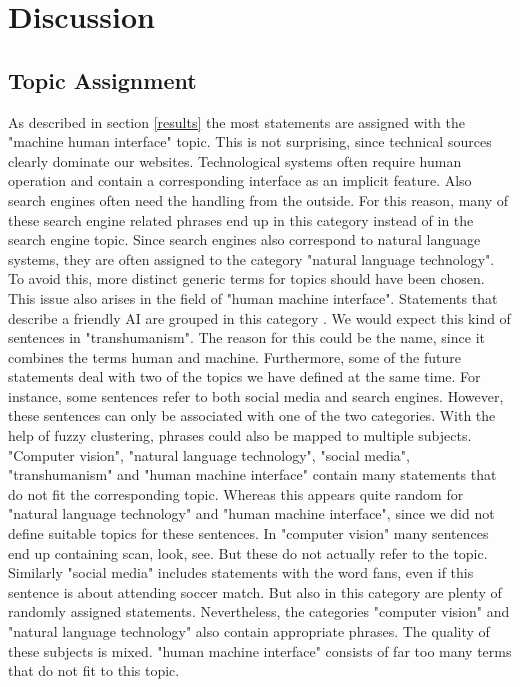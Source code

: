 \section{Discussion}

\subsection{Topic Assignment}
As described in section \ref{results} the most statements are assigned with the "machine human interface" topic.
This is not surprising, since technical sources clearly dominate our websites. 
Technological systems often require human operation and contain a corresponding interface as an implicit feature.
Also search engines often need the handling from the outside. 
For this reason, many of these search engine related phrases end up in this category instead of in the search engine topic.
Since search engines also correspond to natural language systems, they are often assigned to the category "natural language technology".
To avoid this, more distinct generic terms for topics should have been chosen.
This issue also arises in the field of "human machine interface". 
Statements that describe a friendly AI are grouped in this category . 
We would expect this kind of sentences in "transhumanism".
The reason for this could be the name, since it combines the terms human and machine.
Furthermore, some of the future statements deal with two of the topics we have defined at the same time. 
For instance, some sentences refer to both social media and search engines. However, these sentences can only be associated with one of the two categories.
With the help of fuzzy clustering, phrases could also be mapped to multiple subjects.
\\
"Computer vision", "natural language technology", "social media", "transhumanism" and "human machine interface" contain many statements that do not fit the corresponding topic.
Whereas this appears quite random for "natural language technology" and "human machine interface", since we did not define suitable topics for these sentences.
In "computer vision" many sentences end up containing scan, look, see.
But these do not actually refer to the topic.
Similarly "social media" includes  statements with the word fans, even if this sentence is about attending soccer match.
But also in this category are plenty of randomly assigned statements.
Nevertheless, the categories "computer vision" and "natural language technology" also contain appropriate phrases.  
The quality of these subjects is mixed.
"human machine interface" consists of far too many terms that do not fit to this topic. 
